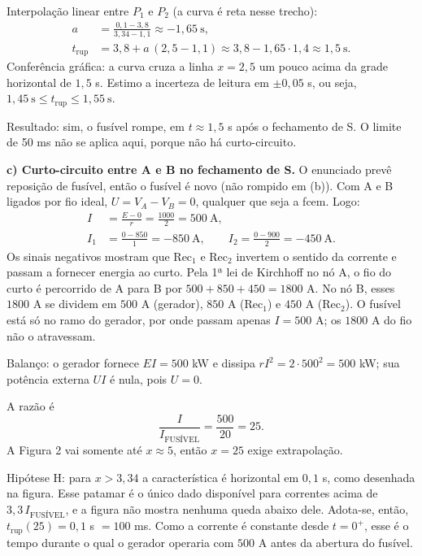 \documentclass{article}%
\begin{document}
Interpolação linear entre $P_1$ e $P_2$ (a curva é reta nesse trecho):
\begin{align*}
a &= \frac{0{,}1 - 3{,}8}{3{,}34 - 1{,}1} \approx -1{,}65\ \text{s}, \\
t_{\text{rup}} &= 3{,}8 + a\,(2{,}5 - 1{,}1) \approx 3{,}8 - 1{,}65 \cdot 1{,}4 \approx 1{,}5\ \text{s}.
\end{align*}
Conferência gráfica: a curva cruza a linha $x = 2{,}5$ um pouco acima da grade horizontal de $1{,}5$ s. Estimo a incerteza de leitura em $\pm 0{,}05$ s, ou seja, $1{,}45\ \text{s} \le t_{\text{rup}} \le 1{,}55\ \text{s}$.

Resultado: sim, o fusível rompe, em $t \approx 1{,}5$ s após o fechamento de S. O limite de 50 ms não se aplica aqui, porque não há curto-circuito.

\textbf{c) Curto-circuito entre A e B no fechamento de S.} O enunciado prevê reposição de fusível, então o fusível é novo (não rompido em (b)). Com A e B ligados por fio ideal, $U = V_A - V_B = 0$, qualquer que seja a fcem. Logo:
\begin{align*}
I &= \frac{E - 0}{r} = \frac{1000}{2} = 500\ \text{A}, \\
I_1 &= \frac{0 - 850}{1} = -850\ \text{A}, \qquad I_2 = \frac{0 - 900}{2} = -450\ \text{A}.
\end{align*}
Os sinais negativos mostram que Rec$_1$ e Rec$_2$ invertem o sentido da corrente e passam a fornecer energia ao curto. Pela 1ª lei de Kirchhoff no nó A, o fio do curto é percorrido de A para B por $500 + 850 + 450 = 1800$ A. No nó B, esses $1800$ A se dividem em $500$ A (gerador), $850$ A (Rec$_1$) e $450$ A (Rec$_2$). O fusível está só no ramo do gerador, por onde passam apenas $I = 500$ A; os $1800$ A do fio não o atravessam.

Balanço: o gerador fornece $EI = 500$ kW e dissipa $rI^2 = 2 \cdot 500^2 = 500$ kW; sua potência externa $UI$ é nula, pois $U = 0$.

A razão é
\[ \frac{I}{I_{\text{FUSÍVEL}}} = \frac{500}{20} = 25. \]
A Figura 2 vai somente até $x \approx 5$, então $x = 25$ exige extrapolação.

Hipótese H: para $x > 3{,}34$ a característica é horizontal em $0{,}1$ s, como desenhada na figura. Esse patamar é o único dado disponível para correntes acima de $3{,}3\, I_{\text{FUSÍVEL}}$, e a figura não mostra nenhuma queda abaixo dele. Adota-se, então, $t_{\text{rup}}(25) = 0{,}1$ s $= 100$ ms. Como a corrente é constante desde $t = 0^+$, esse é o tempo durante o qual o gerador operaria com $500$ A antes da abertura do fusível.
\end{document}
